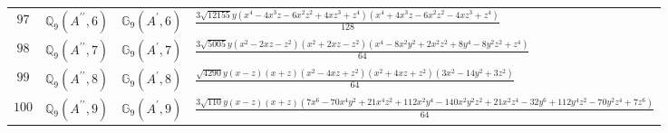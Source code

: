 \documentclass[fleqn,8pt,landscape]{jsarticle}
\begin{document}
\begin{table}[ht!]
\begin{center}
\begin{tabular}{cccl}
$ 97 $ & $ \mathbb{Q}_{9}(A^{\prime\prime},6) $ & $ \mathbb{G}_{9}(A^{\prime},6) $ & $ \frac{3 \sqrt{12155} y \left(x^{4} - 4 x^{3} z - 6 x^{2} z^{2} + 4 x z^{3} + z^{4}\right) \left(x^{4} + 4 x^{3} z - 6 x^{2} z^{2} - 4 x z^{3} + z^{4}\right)}{128} $ \\
$ 98 $ & $ \mathbb{Q}_{9}(A^{\prime\prime},7) $ & $ \mathbb{G}_{9}(A^{\prime},7) $ & $ \frac{3 \sqrt{5005} y \left(x^{2} - 2 x z - z^{2}\right) \left(x^{2} + 2 x z - z^{2}\right) \left(x^{4} - 8 x^{2} y^{2} + 2 x^{2} z^{2} + 8 y^{4} - 8 y^{2} z^{2} + z^{4}\right)}{64} $ \\
$ 99 $ & $ \mathbb{Q}_{9}(A^{\prime\prime},8) $ & $ \mathbb{G}_{9}(A^{\prime},8) $ & $ \frac{\sqrt{4290} y \left(x - z\right) \left(x + z\right) \left(x^{2} - 4 x z + z^{2}\right) \left(x^{2} + 4 x z + z^{2}\right) \left(3 x^{2} - 14 y^{2} + 3 z^{2}\right)}{64} $ \\
$ 100 $ & $ \mathbb{Q}_{9}(A^{\prime\prime},9) $ & $ \mathbb{G}_{9}(A^{\prime},9) $ & $ \frac{3 \sqrt{110} y \left(x - z\right) \left(x + z\right) \left(7 x^{6} - 70 x^{4} y^{2} + 21 x^{4} z^{2} + 112 x^{2} y^{4} - 140 x^{2} y^{2} z^{2} + 21 x^{2} z^{4} - 32 y^{6} + 112 y^{4} z^{2} - 70 y^{2} z^{4} + 7 z^{6}\right)}{64} $ \\
 \hline \hline
\end{tabular}
\end{center}
\end{table}
\end{document}
